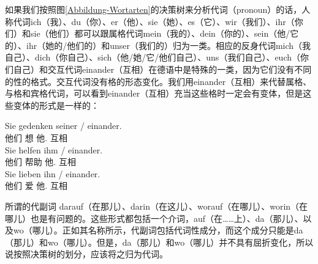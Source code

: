 如果我们按照图\ref{Abbildung-Wortarten}的决策树来分析代词（pronoun）的话，人称代词ich（我）、du（你）、er（他）、sie（她）、es（它）、wir（我们）、ihr（你们）和sie（他们）都可以跟属格代词mein（我的）、dein（你的）、sein（他/它的）、ihr（她的/他们的）和unser（我们的）归为一类。相应的反身代词mich（我自己）、dich（你自己）、sich（他/她/它/他们自己）、uns（我们自己）、euch（你们自己）和交互代词einander（互相）在德语中是特殊的一类，因为它们没有不同的性的格式。交互代词没有格的形态变化。我们用einander（互相）来代替属格、与格和宾格代词，可以看到einander（互相）充当这些格时一定会有变体，但是这些变体的形式是一样的：

\eal
\ex 
\gll Sie gedenken seiner / einander.\\
	 他们 想 他.\gen{} {} 互相\\
\ex 
\gll Sie helfen ihm / einander.\\
	 他们 帮助 他.\dat{} {} 互相\\
\ex 
\gll Sie lieben ihn / einander.\\
	 他们 爱 他.\acc{} {} 互相\\
\zl
%

所谓的代副词 darauf（在那儿）、darin（在这儿）、worauf（在哪儿）、worin（在哪儿）也是有问题的。这些形式都包括一个介词，\egc auf（在……上）、da（那儿）、以及wo（哪儿）。正如其名称所示，代副词包括代词性成分，而这个成分只能是da（那儿）和wo（哪儿）。但是，da（那儿）和wo（哪儿）并不具有屈折变化，所以说按照决策树的划分，应该将之归为代词。

